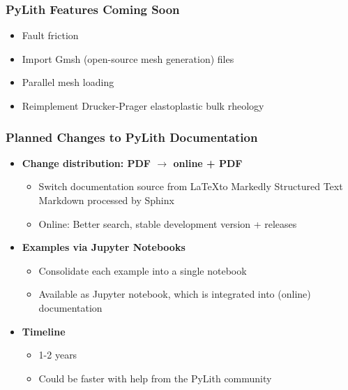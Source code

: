 \documentclass[aspectratio=169]{beamer}
\newcommand{\highlight}[1]{{\bf\color{green}#1}}
\begin{document}
\begin{frame}
  \frametitle{PyLith Features Coming Soon}

  \begin{itemize}
  \item Fault friction
  \item Import Gmsh (open-source mesh generation) files
  \item Parallel mesh loading
  \item Reimplement Drucker-Prager elastoplastic bulk rheology
  \end{itemize}
  
\end{frame}


\begin{frame}
  \frametitle{Planned Changes to PyLith Documentation}
  \summary{}

  \begin{itemize}
  \item \highlight{Change distribution: PDF $\rightarrow$ online + PDF}
    \begin{itemize}
    \item Switch documentation source from \LaTeX to Markedly
      Structured Text\\ Markdown processed by Sphinx
    \item Online: Better search, stable development version + releases
    \end{itemize}
  \item \highlight{Examples via Jupyter Notebooks}
    \begin{itemize}
    \item Consolidate each example into a single
      notebook
    \item Available as Jupyter notebook, which is integrated into
      (online) documentation
    \end{itemize}
  \item \highlight{Timeline}
    \begin{itemize}
    \item 1-2 years
    \item Could be faster with help from the PyLith community
    \end{itemize}
  \end{itemize}
  
\end{frame}
\end{document}
